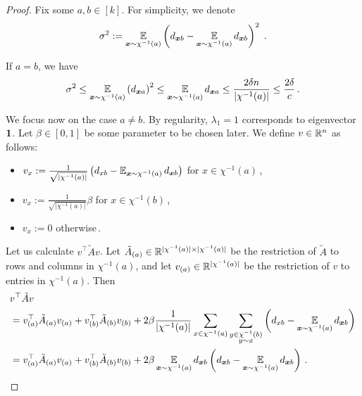 \begin{proof}
    Fix some $a, b \in [k]$.
    For simplicity, we denote \[\sigma^2 := \operatorname*{\mathbb{E}}_{\bm{x} \sim \chi^{-1}(a)} \left(d_{\bm{x}b}-\operatorname*{\mathbb{E}}_{\bm{x} \sim \chi^{-1}(a)} d_{\bm{x}b}\right)^2\;.\]

    If $a = b$, we have 
    \begin{align*}
        \sigma^2
        \leq \operatorname*{\mathbb{E}}_{\bm{x} \sim \chi^{-1}(a)} \left(d_{\bm{x}a}\right)^2
        \leq \operatorname*{\mathbb{E}}_{\bm{x} \sim \chi^{-1}(a)} d_{\bm{x}a}
        \leq \frac{2 \delta n}{|\chi^{-1}(a)|}
        \leq \frac{2\delta}{c}\,.
    \end{align*}

    We focus now on the case $a \neq b$.
    By regularity, $\lambda_1=1$ corresponds to eigenvector $\mathbf{1}$.
    Let $\beta \in [0, 1]$ be some parameter to be chosen later.
    We define $v \in {\mathbb R}^n$ as follows:
    \begin{itemize}
        \item $v_x:=\frac{1}{\sqrt{|\chi^{-1}(a)|}}\left(d_{xb}-\operatorname*{\mathbb{E}}_{\bm{x} \sim \chi^{-1}(a)} d_{\bm{x}b}\right)$ for $x\in \chi^{-1}(a)$\,,
        \item $v_x:=\frac{1}{\sqrt{|\chi^{-1}(a)|}}\beta$ for $x\in \chi^{-1}(b)$\,,
        \item $v_x:=0$ otherwise\,.
    \end{itemize}

    Let us calculate $v^\top \tilde{A}v$.
    Let $\tilde{A}_{(a)} \in {\mathbb R}^{|\chi^{-1}(a)| \times |\chi^{-1}(a)|}$ be the restriction of $\tilde{A}$ to rows and columns in $\chi^{-1}(a)$, and let $v_{(a)} \in {\mathbb R}^{|\chi^{-1}(a)|}$ be the restriction of $v$ to entries in $\chi^{-1}(a)$.
    Then
    \begin{align}
    \begin{split}
    \label{eq:3_col_num}
        &v^\top \tilde{A}v\\
        &= v_{(a)}^\top \tilde{A}_{(a)} v_{(a)} + v_{(b)}^\top \tilde{A}_{(b)} v_{(b)} + 2 \beta \frac{1}{|\chi^{-1}(a)|} \sum_{x \in \chi^{-1}(a)} \sum_{\substack{y \in \chi^{-1}(b)\\y \sim x}} \Paren{\D{x}{b}-\E_{\bm{x} \sim \chi^{-1}(a)} \D{\bm{x}}{b}}\\
        &= v_{(a)}^\top \tilde{A}_{(a)} v_{(a)} + v_{(b)}^\top \tilde{A}_{(b)} v_{(b)} + 2 \beta \E_{\bm{x} \sim \chi^{-1}(a)} \D{\bm{x}}{b} \Paren{\D{\bm{x}}{b}-\E_{\bm{x} \sim \chi^{-1}(a)} \D{\bm{x}}{b}}\,.
    \end{split}
    \end{align}


\end{proof}

